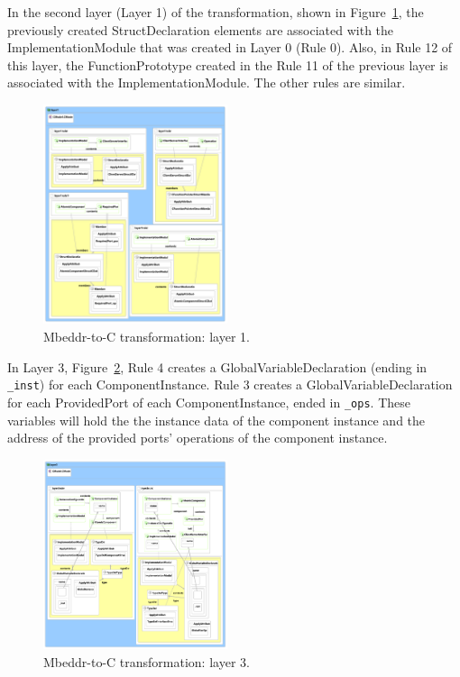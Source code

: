  In the second layer
(Layer 1) of the transformation, shown in Figure~\ref{fig:mb2c_layer_1}, the
previously created StructDeclaration elements are associated with the
ImplementationModule that was created in Layer 0 (Rule 0).
Also, in Rule 12 of this layer, the FunctionPrototype created in the Rule 11 of
the previous layer is associated with the ImplementationModule.
The other rules are similar.

\begin{figure}
\begin{center}
  \includegraphics[width=0.48\textwidth]{figures/mbeddr2C_optimized_layer_1}
  \caption{Mbeddr-to-C transformation: layer 1.}
  \label{fig:mb2c_layer_1}
\end{center}
\end{figure}

In Layer 3, Figure~\ref{fig:mb2c_layer_3}, Rule 4 creates a
GlobalVariableDeclaration (ending in \verb=_inst=) for each ComponentInstance.
Rule 3 creates a GlobalVariableDeclaration for each ProvidedPort of each
ComponentInstance, ended in \verb=_ops=.
These variables will hold the the instance data of the component instance and
the address of the provided ports' operations of the component instance.

\begin{figure}
\begin{center}
  \includegraphics[width=0.48\textwidth]{figures/mbeddr2C_optimized_layer_3}
  \caption{Mbeddr-to-C transformation: layer 3.}
  \label{fig:mb2c_layer_3}
\end{center}
\end{figure}

